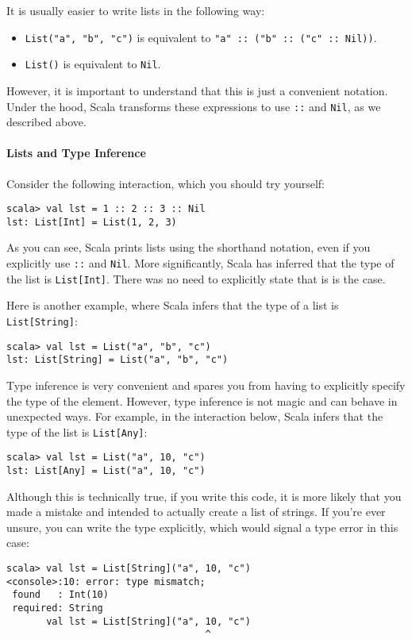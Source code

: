 \documentclass[9pt]{extbook}
\begin{document}
It is usually easier to write lists in the following way:
%
\begin{itemize}

  \item \lstinline|List("a", "b", "c")| is equivalent to
  \lstinline|"a" :: ("b" :: ("c" :: Nil))|.

  \item \lstinline|List()| is equivalent to \lstinline|Nil|.

\end{itemize}
%
However, it is important to understand that this is just a convenient notation.
Under the hood, Scala transforms these expressions to use \lstinline|::|
and \lstinline|Nil|, as we described above.

\paragraph{Lists and Type Inference}
\lstset{language=console}
Consider the following interaction, which you should try yourself:
%
\begin{lstlisting}
scala> val lst = 1 :: 2 :: 3 :: Nil
lst: List[Int] = List(1, 2, 3)
\end{lstlisting}
%
\lstset{language=scala}

As you can see, Scala prints lists using the shorthand notation,
even if you explicitly use \lstinline|::| and \lstinline|Nil|.
More significantly, Scala has inferred that the type of the list
is \lstinline|List[Int]|. There was no need to explicitly state that
is is the case.

Here is another example, where Scala infers that the type of a list is
\lstinline|List[String]|:
%
\lstset{language=console}
\begin{lstlisting}
scala> val lst = List("a", "b", "c")
lst: List[String] = List("a", "b", "c")
\end{lstlisting}

\lstset{language=scala}
Type inference is very convenient and spares you from having to explicitly
specify the type of the element. However, type inference is not magic
and can behave in unexpected ways. For example, in the interaction
below, Scala infers that the type of the list is \lstinline|List[Any]|:
%
\lstset{language=console}
\begin{lstlisting}
scala> val lst = List("a", 10, "c")
lst: List[Any] = List("a", 10, "c")
\end{lstlisting}
Although this is technically true, if you write this code, it is more
likely that you made a mistake and intended to actually create a list of
strings. If you're ever unsure, you can write the type explicitly, which
would signal a type error in this case:
\begin{lstlisting}
scala> val lst = List[String]("a", 10, "c")
<console>:10: error: type mismatch;
 found   : Int(10)
 required: String
       val lst = List[String]("a", 10, "c")
                                   ^
\end{lstlisting}
\end{document}
